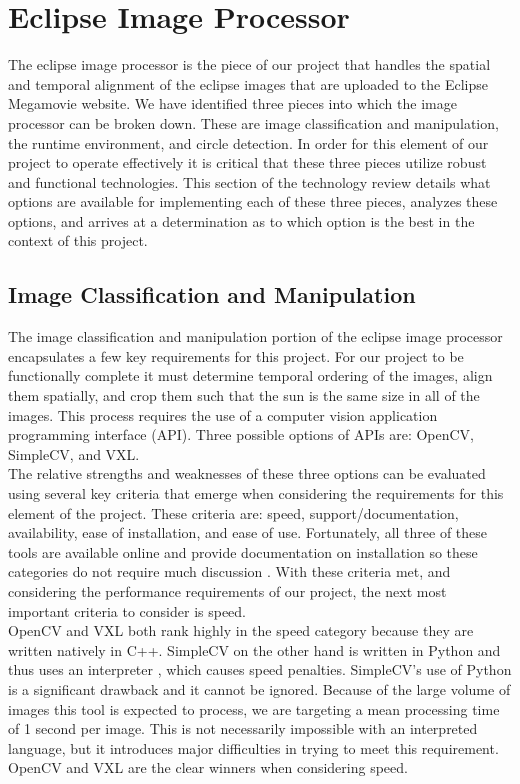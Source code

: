 \documentclass[10pt, onecolumn, draftclsnofoot, letterpaper, compsoc]{IEEEtran}
\begin{document}
\section{Eclipse Image Processor}

The eclipse image processor is the piece of our project that handles the spatial
and temporal alignment of the eclipse images that are uploaded to the Eclipse
Megamovie website. We have identified three pieces into which
the image processor can be broken down. These are image classification and
manipulation, the runtime environment, and circle detection. In order for this
element of our project to operate effectively it is critical that these three
pieces utilize robust and functional technologies. This section of the
technology review details what options are available for implementing each of
these three pieces, analyzes these options, and arrives at a determination as to
which option is the best in the context of this project.\\

\subsection{Image Classification and Manipulation}

The image classification and manipulation portion of the eclipse image processor
encapsulates a few key requirements for this project. For our project to be
functionally complete it must determine temporal ordering of the images, align
them spatially, and crop them such that the sun is the same size in all of the
images. This process requires the use of a computer vision application
programming interface (API). Three possible options of APIs are: OpenCV,
SimpleCV, and VXL. \\

The relative strengths and weaknesses of these three options can be evaluated
using several key criteria that emerge when considering the requirements for
this element of the project. These criteria are: speed, support/documentation,
availability, ease of installation, and ease of use. Fortunately, all three of
these tools are available online and provide documentation on installation so
these categories do not require much discussion \cite{OCV, VXL, SCV}. With these
criteria met, and considering the performance requirements of our project, the
next most important criteria to consider is speed. \\

OpenCV and VXL both rank highly in the speed category because they are written
natively in C++\cite{OCV, VXL}. SimpleCV on the other hand is written in Python
and thus uses an interpreter \cite{SCV}, which causes speed penalties.
SimpleCV's use of Python is a significant drawback and it cannot be ignored.
Because of the large volume of images this tool is expected to process, we are
targeting a mean processing time of 1 second per image. This is not necessarily
impossible with an interpreted language, but it introduces major difficulties in
trying to meet this requirement. OpenCV and VXL are the clear winners when
considering speed. \\
\end{document}
